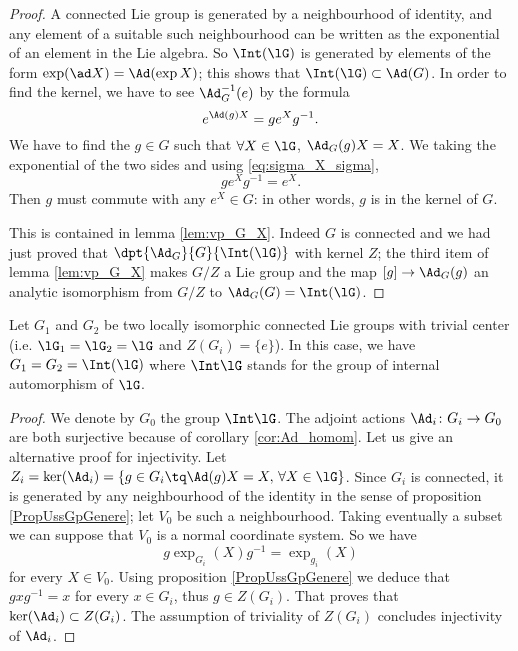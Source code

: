 \begin{proof}
A connected Lie group is generated by a neighbourhood of identity, and any element of a suitable such neighbourhood can be written as the exponential of an element in the Lie algebra. So $\Int(\lG)$ is generated by elements of the form $\exp(\ad X)=\Ad(\exp X)$; this shows that $\Int(\lG)\subset\Ad(G)$. In order to find the kernel, we have to  see $\Ad_G^{-1}(e)$ by the formula 
\[ 
   e^{\Ad(g)X}=g e^Xg^{-1}.
\]
We have to find the $g\in G$ such that $\forall X\in\lG$, $\Ad_G(g)X=X$. We taking the exponential of the two sides and using \eqref{eq:sigma_X_sigma},
\begin{equation}
  g e^Xg^{-1}=e^X.
\end{equation}
Then $g$ must commute with any $e^X\in G$: in other words, $g$ is in the kernel of $G$.

This is contained in lemma \ref{lem:vp_G_X}. Indeed $G$ is connected and we had just proved that $\dpt{\Ad_G}{G}{\Int(\lG)}$ with kernel $Z$; the third item of lemma \ref{lem:vp_G_X} makes $G/Z$ a Lie group and the map $[g]\to\Ad_G(g)$ an analytic isomorphism from $G/Z$ to $\Ad_G(G)=\Int(\lG)$.
\end{proof}


\begin{lemma}
Let $G_1$ and $G_2$ be two locally isomorphic connected Lie groups with trivial center (i.e. $\lG_1=\lG_2=\lG$ and $Z(G_i)=\{ e \}$). In this case, we have $G_1=G_2=\Int(\lG)$ where $\Int\lG$ stands for the group of internal automorphism of $\lG$.
\end{lemma}

\begin{proof}
We denote by $G_0$ the group $\Int\lG$. The adjoint actions $\Ad_i\colon G_i\to G_0$ are both surjective because of corollary \ref{cor:Ad_homom}. Let us give an alternative proof for injectivity. Let $Z_i=\ker(\Ad_i)=\{ g\in G_i\tq\Ad(g)X=X,\,\forall X\in\lG \}$. Since $G_i$ is connected, it is generated by any neighbourhood of the identity in the sense of proposition \ref{PropUssGpGenere}; let $V_0$ be such a neighbourhood. Taking eventually a subset we can suppose that $V_0$ is a normal coordinate system. So we have
\[ 
  g\exp_{G_i}(X)g^{-1}=\exp_{g_i}(X)
\]
for every $X\in V_0$. Using proposition \ref{PropUssGpGenere} we deduce that $gxg^{-1}=x$ for every $x\in G_i$, thus $g\in Z(G_i)$. That proves that $\ker(\Ad_i)\subset Z(G_i)$. The assumption of triviality of $Z(G_i)$ concludes injectivity of $\Ad_i$.
\end{proof}

